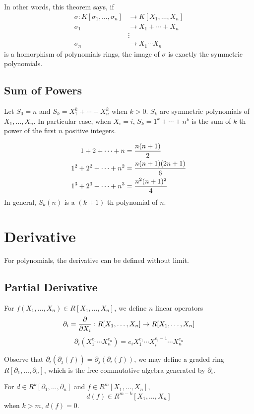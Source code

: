 \documentclass{article}
\begin{document}
In other words, this theorem says, if
\begin{align*}
  \sigma: K[\sigma_1, \dots, \sigma_n] &\to K[X_1, \dots, X_n] \\
  \sigma_1 &\to X_1 + \cdots + X_n \\
  &\vdots \\
  \sigma_n &\to X_1 \cdots X_n
\end{align*}
is a homorphism of polynomials rings, the image of $\sigma$ is
exactly the symmetric polynomials.

\subsection{Sum of Powers}
Let $S_0 = n$ and $S_k = X_1^k + \cdots + X_n^k$ when $k > 0$.
$S_k$ are symmetric polynomials of $X_1, \dots, X_n$.
In particular case, when $X_i = i$, $S_k = 1^k + \cdots + n^k$ is the sum of $k$-th power
of the first $n$ positive integers.

\begin{align*}
    1 + 2 + \cdots + n &= {n(n + 1) \over 2} \\
    1^2 + 2^2 + \cdots + n^2 &= {n(n + 1)(2n + 1) \over 6} \\
    1^3 + 2^3 + \cdots + n^3 &= {n^2(n + 1)^2 \over 4}
\end{align*}
In general, $S_k(n)$ is a $(k + 1)$-th polynomial of $n$.


\section{Derivative}
For polynomials, the derivative can be defined without limit.

\subsection{Partial Derivative}
For $f(X_1, \dots, X_n) \in R[X_1, \dots, X_n]$, we define $n$ linear operators
$$\partial_i = {\partial \over \partial X_i} : R[X_1, \dots, X_n] \to R[X_1, \dots, X_n]$$
$$\partial_i(X_1^{e_1} \cdots X_n^{e_n}) = e_i X_1^{e_1} \cdots X_i^{e_i-1} \cdots X_n^{e_n}$$

Observe that $\partial_i(\partial_j(f)) = \partial_j(\partial_i(f))$, we may define
a graded ring $R[\partial_1, \dots, \partial_n]$, which is the free commutative algebra generated by
$\partial_i$.

For $d \in R^k[\partial_1, \dots, \partial_n]$ and $f \in R^m[X_1, \dots, X_n]$,
$$d(f) \in R^{m-k}[X_1, \dots, X_n]$$
when $k > m$, $d(f) = 0$.
\end{document}
